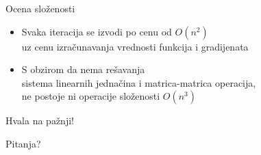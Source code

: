 \documentclass[serbian]{beamer}
\begin{document}
\begin{frame}{Ocena slo\v zenosti}

\begin{itemize}
	\item Svaka iteracija se izvodi po cenu od $O(n^2)$ \\
	uz cenu izra\v cunavanja vrednosti funkcija i gradijenata
	
	\item S obzirom da nema re\v savanja \\
	sistema linearnih jedna\v cina i matrica-matrica operacija, \\
	ne postoje ni operacije slo\v zenosti $O(n^3)$
\end{itemize}

\end{frame}

\begin{frame}

\vspace*{3em}

{\Large Hvala na pa\v znji!} 

\vspace*{1em}

Pitanja?

\end{frame}
\end{document}
